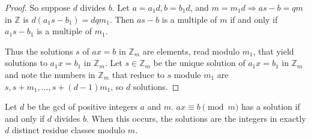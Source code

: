 \documentclass[a4paper,8pt]{article}
\begin{document}
\begin{outline}
\begin{proof}
      So suppose \(d\) divides \(b\). Let \(a = a_1d, b = b_1d\), and \(m = m_1d \Rightarrow as -b = qm\) in
      \(\mathbb{Z}\) is \(d(a_1s-b_1) = dqm_1\). Then \(as - b\) is a multiple of \(m\) if and only if
      \(a_1s - b_1\) is a multiple of \(m_1\).

      Thus the solutions \(s\) of \(ax = b\) in \(\mathbb{Z}_m\) are elements, read modulo \(m_1\), that yield solutions
      to \(a_1x = b_1\) in \(\mathbb{Z}_m\). Let \(s \in \mathbb{Z}_m\) be the unique solution of \(a_1x = b_1\) in
      \(\mathbb{Z}_m\) and note the numbers in \(\mathbb{Z}_m\) that reduce to \(s\) module \(m_1\) are \(s, s + m_1,
      \ldots, s + (d-1)m_1\), so \(d\) solutions.
    \end{proof}

    Let \(d\) be the gcd of positive integers \(a\) and \(m\). \(ax \equiv b \pmod{m}\) has a solution
    if and only if \(d\) divides \(b\). When this occurs, the solutions are the integers in exactly \(d\) distinct residue
    classes modulo \(m\).

\end{outline}
\end{document}
